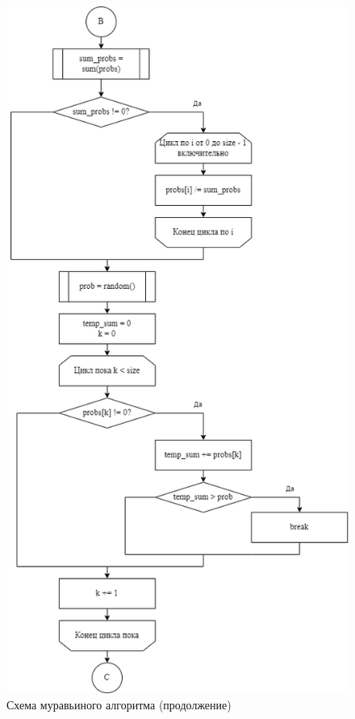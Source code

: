 \begin{figure}[h!btp]
	\centering
	\includegraphics[width=340pt]{inc/scheme_ant_alg_2.png}
	\caption{Схема муравьиного алгоритма (продолжение)}
	\label{fig:ant2}	
\end{figure}

\clearpage


